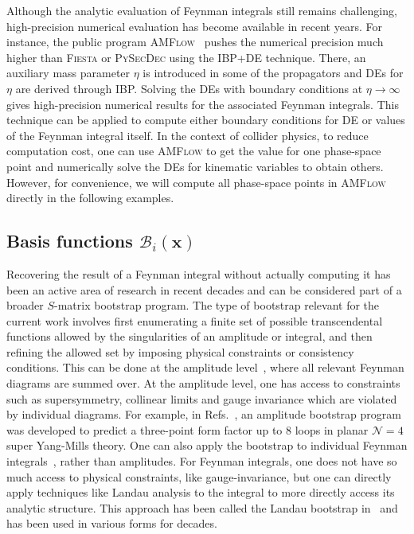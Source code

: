 \documentclass[a4paper,11pt]{article}
\begin{document}
Although the analytic evaluation of Feynman integrals still remains challenging, high-precision numerical evaluation has become available in recent years.
For instance, the public program \textsc{AMFlow}~\cite{Liu:2017jxz, Liu:2018dmc, Liu:2021wks,Liu:2022chg, Liu:2022mfb} pushes the numerical precision much higher than \textsc{Fiesta} or \textsc{PySecDec} using the IBP+DE technique. There, an auxiliary mass parameter $\eta$ is introduced in some of the propagators and DEs for $\eta$ are derived through IBP. Solving the DEs with boundary conditions at $\eta\to\infty$ gives high-precision numerical results for the associated Feynman integrals. This technique can be applied to compute either boundary conditions for DE or values of the Feynman integral itself. In the context of collider physics, to reduce computation cost, one can use \textsc{AMFlow} to get the value for one phase-space point and numerically solve the DEs for kinematic variables to obtain others. However, for convenience, we will compute all phase-space points in \textsc{AMFlow} directly in the following examples.


\subsection{Basis functions $\mathcal{B}_i(\mathbf{x})$\label{sec:basis_set}}
Recovering the result of a Feynman integral without actually computing it has been an active area of research in recent decades and can be considered part of a broader $S$-matrix bootstrap program. The type of bootstrap relevant for the current work involves first enumerating a finite set of possible transcendental functions allowed by the singularities of an amplitude or integral,
and then refining the allowed set by imposing physical constraints or consistency conditions. This can be done at the amplitude level~\cite{Dixon:2016nkn,Caron-Huot:2016owq,Caron-Huot:2019vjl,Dixon:2020bbt,Dixon:2022rse,Basso:2024hlx,Cai:2024znx,Cai:2025atc,Guo:2021bym}, where all relevant Feynman diagrams are summed over. At the amplitude level, one has access to constraints such as supersymmetry, collinear limits and gauge invariance which are violated by individual diagrams. For example, in Refs.~\cite{Dixon:2020bbt, Dixon:2022rse}, an amplitude bootstrap program was developed to predict a three-point form factor up to 8 loops in planar $\mathcal{N}=4$ super Yang-Mills theory. One can also apply the bootstrap to individual Feynman integrals~\cite{Chicherin:2017dob,Caron-Huot:2018dsv,Henn:2018cdp,He:2021fwf,He:2021eec,Morales:2022csr}, rather than amplitudes. For Feynman integrals, one does not have so much access to physical constraints, like gauge-invariance, but one can directly apply techniques like Landau analysis to the integral to more directly access its analytic structure.
This approach has been called the Landau bootstrap in~\cite{Hannesdottir:2024hke} and has been used in various forms for decades.
\end{document}
